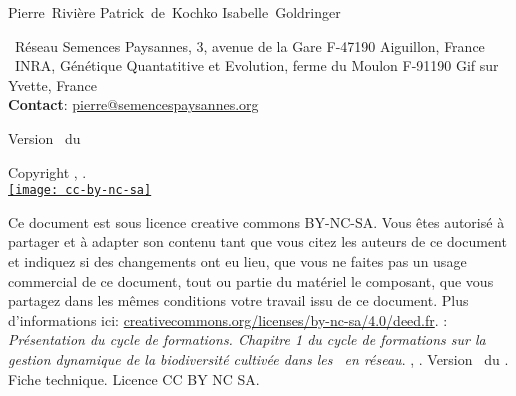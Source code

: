 
\begin{center}
\vfill
\normalsize
Pierre~Rivière \hspace{.5cm}
Patrick~de~Kochko \hspace{.5cm}
Isabelle~Goldringer \\
\small
\end{center}
\noindent{}~Réseau Semences Paysannes, 3, avenue de la Gare F-47190 Aiguillon, France \\
\noindent{}~INRA, Génétique Quantatitive et Evolution, ferme du Moulon F-91190 Gif sur Yvette, France \\
\noindent\up{*} \textbf{Contact}: \href{mailto:pierre@semencespaysannes.org}{\textcolor{mln-green} {pierre@semencespaysannes.org}}

\vfill

\begin{center}
\large Version \versionCF~du \dateversionCF
\end{center}

\vfill
\normalsize
\begin{center}
Copyright \RSP, \INRA.
~\\
\href{http://creativecommons.org/licenses/by-nc-sa/4.0/deed.fr}{\texttt{[image: cc-by-nc-sa]}}
\end{center}
\small
Ce document est sous licence creative commons BY-NC-SA.
Vous êtes autorisé à partager et à adapter son contenu tant 
que vous citez les auteurs de ce document et indiquez si des changements ont eu lieu, 
que vous ne faites pas un usage commercial de ce document, tout ou partie du matériel le composant,
que vous partagez dans les mêmes conditions votre travail issu de ce document. 
Plus d'informations ici: \url{creativecommons.org/licenses/by-nc-sa/4.0/deed.fr}.
\vfill
{}:
\textit{
Présentation du cycle de formations.
Chapitre 1 du cycle de formations sur la gestion dynamique de la biodiversité cultivée dans les \MSPs~en réseau}.
\RSP, \INRA.
Version \versionCF~du \dateversionCF.
Fiche technique.
Licence CC BY NC SA.

\newpage
